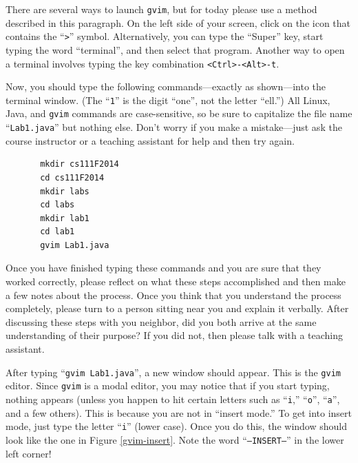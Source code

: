 There are several ways to launch {\tt gvim}, but for today please use a method described in this paragraph.  On the
left side of your screen, click on the icon that contains the ``{\tt >}'' symbol.  Alternatively, you can type the
``Super'' key, start typing the word ``terminal'', and then select that program.  Another way to open a terminal
involves typing the key combination {\tt <Ctrl>-<Alt>-t}.


Now, you should type the following commands---exactly as shown---into the terminal window.  (The ``{\tt 1}'' is the
  digit ``one'', not the letter ``ell.'') All Linux, Java, and {\tt gvim} commands are case-sensitive, so be sure to
capitalize the file name ``{\tt Lab1.java}'' but nothing else.  Don't worry if you make a mistake---just ask the course
instructor or a teaching assistant for help and then try again.

\vspace*{-.1in}
\begin{verbatim}
       mkdir cs111F2014
       cd cs111F2014
       mkdir labs
       cd labs
       mkdir lab1
       cd lab1
       gvim Lab1.java
\end{verbatim}
\vspace*{-.1in}

Once you have finished typing these commands and you are sure that they worked correctly, please reflect on what these
steps accomplished and then make a few notes about the process.  Once you think that you understand the process
completely, please turn to a person sitting near you and explain it verbally.  After discussing these steps with you
neighbor, did you both arrive at the same understanding of their purpose? If you did not, then please talk with a teaching
assistant. 

After typing ``{\tt gvim Lab1.java}'', a new window should appear. This is the {\tt gvim} editor.  Since {\tt gvim} is a
modal editor, you may notice that if you start typing, nothing appears (unless you happen to hit certain letters such as
  ``{\tt i},'' ``{\tt o}'', ``{\tt a}'', and a few others). This is because you are not in ``insert mode.'' To get into
insert mode, just type the letter ``{\tt i}'' (lower case). Once you do this, the window should look like the one in
Figure \ref{gvim-insert}. Note the word ``{\tt --INSERT--}'' in the lower left corner!


